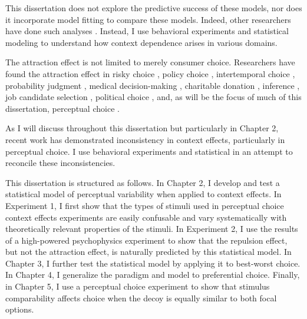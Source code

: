 This dissertation does not explore the predictive success of these models, nor does it incorporate model fitting to compare these models. Indeed, other researchers have done such analyses \parencite{turnerCompetingTheoriesMultialternative2018a,cataldoModelingPreferenceReversals2021,evansResponsetimeDataProvide2019b,molloyWhatResponseTime2019a,berkowitschRigorouslyTestingMultialternative2014b,hotalingTheoreticalDevelopmentsDecision2010,cohen2017multi}. Instead, I use behavioral experiments and statistical modeling to understand how context dependence arises in various domains.

The attraction effect is not limited to merely consumer choice. Researchers have found the attraction effect in risky choice \parencite{mohr2017attraction}, policy choice \parencite{herneDecoyAlternativesPolicy1997b}, intertemporal choice \parencite{mariniAttractionComesMany2020}, probability judgment \parencite{caiWhenAlternativeHypotheses2023}, medical decision-making \parencite{schwartz1999more}, charitable donation \parencite{pittarello2020three},  inference \parencite{truebloodMultialternativeContextEffects2012}, job candidate selection \parencite{highhouseContextDependentSelectionEffects1996}, political choice \parencite{pan1995attractiovoting}, and, as will be the focus of much of this dissertation, perceptual choice \parencite{evansImpactPresentationOrder2021,trueblood2013not,spektorRepulsionEffectPreferential2022,spektorWhenGoodLooks2018b,yearsleyContextEffectsSimilarity2022,turnerCompetingTheoriesMultialternative2018a,liaoInfluenceDistanceDecoy2021}. 

As I will discuss throughout this dissertation but particularly in Chapter 2, recent work has demonstrated inconsistency in context effects, particularly in perceptual choice. I use behavioral experiments and statistical in an attempt to reconcile these inconsistencies.

This dissertation is structured as follows. In Chapter 2, I develop and test a statistical model of perceptual variability when applied to context effects. In Experiment 1, I first show that the types of stimuli used in perceptual choice context effects experiments are easily confusable and vary systematically with theoretically relevant properties of the stimuli. In Experiment 2, I use the results of a high-powered psychophysics experiment to show that the repulsion effect, but not the attraction effect, is naturally predicted by this statistical model. In Chapter 3, I further test the statistical model by applying it to best-worst choice. In Chapter 4, I generalize the paradigm and model to preferential choice. Finally, in Chapter 5, I use a perceptual choice experiment to show that stimulus comparability affects choice when the decoy is equally similar to both focal options. 
